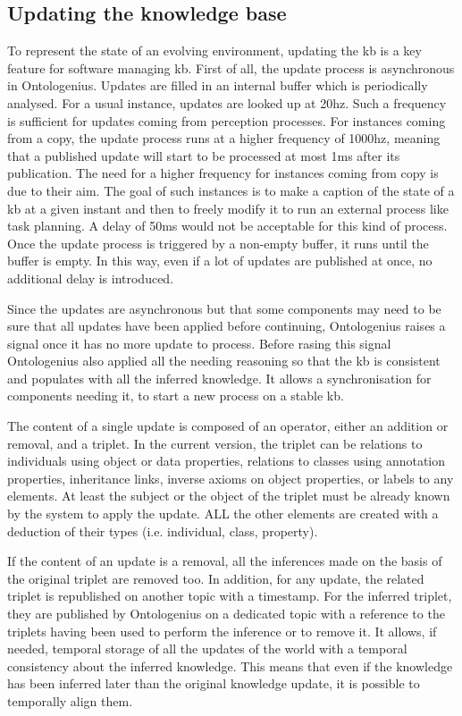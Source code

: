 \subsection{Updating the knowledge base}

To represent the state of an evolving environment, updating the \acrshort{kb} is a key feature for software managing \acrshort{kb}. First of all, the update process is asynchronous in Ontologenius. Updates are filled in an internal buffer which is periodically analysed. For a usual instance, updates are looked up at 20hz. Such a frequency is sufficient for updates coming from perception processes. For instances coming from a copy, the update process runs at a higher frequency of 1000hz, meaning that a published update will start to be processed at most 1ms after its publication. The need for a higher frequency for instances coming from copy is due to their aim. The goal of such instances is to make a caption of the state of a \acrshort{kb} at a given instant and then to freely modify it to run an external process like task planning. A delay of 50ms would not be acceptable for this kind of process. Once the update process is triggered by a non-empty buffer, it runs until the buffer is empty. In this way, even if a lot of updates are published at once, no additional delay is introduced.

Since the updates are asynchronous but that some components may need to be sure that all updates have been applied before continuing, Ontologenius raises a signal once it has no more update to process. Before rasing this signal Ontologenius also applied all the needing reasoning so that the \acrshort{kb} is consistent and populates with all the inferred knowledge. It allows a synchronisation for components needing it, to start a new process on a stable \acrshort{kb}.

The content of a single update is composed of an operator, either an addition or removal, and a triplet. In the current version, the triplet can be relations to individuals using object or data properties, relations to classes using annotation properties, inheritance links, inverse axioms on object properties, or labels to any elements. At least the subject or the object of the triplet must be already known by the system to apply the update. ALL the other elements are created with a deduction of their types (i.e. individual, class, property).

If the content of an update is a removal, all the inferences made on the basis of the original triplet are removed too. In addition, for any update, the related triplet is republished on another topic with a timestamp. For the inferred triplet, they are published by Ontologenius on a dedicated topic with a reference to the triplets having been used to perform the inference or to remove it. It allows, if needed, temporal storage of all the updates of the world with a temporal consistency about the inferred knowledge. This means that even if the knowledge has been inferred later than the original knowledge update, it is possible to temporally align them.

